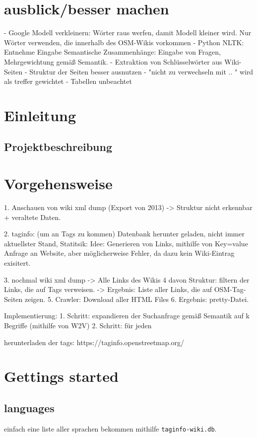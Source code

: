\documentclass[12pt,pdftex,a4paper]{article}
\begin{document}
\section{ausblick/besser machen}
- Google Modell verkleinern: Wörter raus werfen, damit Modell kleiner wird. Nur Wörter verwenden, die innerhalb des OSM-Wikis vorkommen
- Python NLTK: Entnehme Eingabe Semantische Zusammenhänge: Eingabe von Fragen, Mehrgewichtung gemäß Semantik.
- Extraktion von Schlüsselwörter aus Wiki-Seiten
- Struktur der Seiten besser ausnutzen
	- "nicht zu verwechseln mit .. " wird als treffer gewichtet
	- Tabellen unbeachtet

\section{Einleitung}
\subsection{Projektbeschreibung}

\pagebreak
\section{Vorgehensweise}

1. Anschauen von wiki xml dump (Export von 2013) 
-> Struktur nicht erkennbar + veraltete Daten.

2. taginfo: (um an Tags zu kommen) Datenbank herunter geladen, nicht immer aktuellster Stand, Statitsik: Idee: Generieren von Links, mithilfe von Key=value Anfrage an Website, aber möglicherweise Fehler, da dazu kein Wiki-Eintrag exisitert.

3. nochmal wiki xml dump -> Alle Links des Wikis
4  davon Struktur: filtern der Links, die auf Tags verweisen.
-> Ergebnis: Liste aller Links, die auf OSM-Tag-Seiten zeigen.
5. Crawler: Download aller HTML Files
6. Ergebnis: pretty-Datei.

Implementierung:
1. Schritt: expandieren der Suchanfrage gemäß Semantik auf k Begriffe (mithilfe von W2V) 
2. Schritt: für jeden 


herunterladen der tags: https://taginfo.openstreetmap.org/

\section{Gettings started}
\subsection{languages}
einfach eine liste aller sprachen bekommen mithilfe \texttt{taginfo-wiki.db}.
\end{document}
